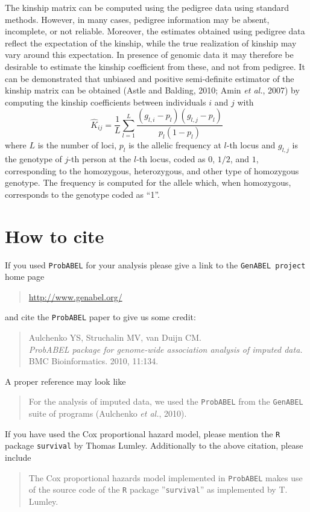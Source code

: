 \documentclass[12pt,a4paper]{article}
\newcommand{\PA}{\texttt{ProbABEL}}
\begin{document}
The kinship matrix can be computed using the pedigree data using standard methods.
However, in many cases, pedigree information may be absent, incomplete, or not
reliable. Moreover, the estimates obtained using pedigree data reflect the
expectation of the kinship, while the true realization of kinship may vary
around this expectation. In presence of genomic data it may therefore be
desirable to estimate the kinship coefficient from these, and not from pedigree.
It can be demonstrated that unbiased and positive semi-definite estimator
of the kinship matrix can be obtained (Astle and Balding, 2010; Amin \emph{et al.}, 2007)
by computing the kinship coefficients between individuals $i$ and $j$ with
$$
\hat{K}_{ij} = \frac{1}{L} \sum_{l=1}^L \frac{ (g_{l,i} - p_l) (g_{l,j} - p_l) }{ p_l (1-p_l) }
$$
where $L$ is the number of loci, $p_l$ is the allelic frequency at $l$-th locus
and $g_{l,j}$ is the genotype of $j$-th person at the $l$-th locus, coded
as $0$, $1/2$, and $1$, corresponding to the homozygous, heterozygous, and
other type of homozygous genotype. The frequency is computed for the allele
which, when homozygous, corresponds to the genotype coded as ``1''.


\section{How to cite}

If you used \PA{} for your analysis please give a link to the
\texttt{GenABEL project} home page
\begin{quote}
\url{http://www.genabel.org/}
\end{quote}
and cite the \PA{} paper to give us some credit:
\begin{quote}
Aulchenko YS, Struchalin MV, van Duijn CM.\\
\emph{ProbABEL package for genome-wide association analysis of imputed data.}\\
BMC Bioinformatics. 2010, 11:134.
\end{quote}
A proper reference may look like
\begin{quote}
For the analysis of imputed data, we used the \PA{}
from the \texttt{GenABEL} suite of programs (Aulchenko \emph{et al.}, 2010).
\end{quote}

If you have used the Cox proportional hazard model, please mention the
\texttt{R} package \texttt{survival} by Thomas Lumley. Additionally
to the above citation, please include
\begin{quote}
The Cox proportional hazards model implemented in \PA{}
makes use of the source code of the \texttt{R} package ''\texttt{survival}''
as implemented by T. Lumley.
\end{quote}
\end{document}
